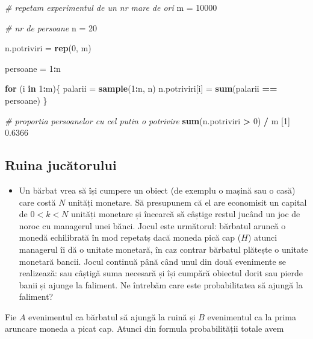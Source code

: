 \documentclass[]{article}
\newenvironment{Shaded}{\begin{snugshade}}{\end{snugshade}}
\newcommand{\KeywordTok}[1]{\textcolor[rgb]{0.13,0.29,0.53}{\textbf{#1}}}
\newcommand{\DecValTok}[1]{\textcolor[rgb]{0.00,0.00,0.81}{#1}}
\newcommand{\FloatTok}[1]{\textcolor[rgb]{0.00,0.00,0.81}{#1}}
\newcommand{\StringTok}[1]{\textcolor[rgb]{0.31,0.60,0.02}{#1}}
\newcommand{\CommentTok}[1]{\textcolor[rgb]{0.56,0.35,0.01}{\textit{#1}}}
\newcommand{\ControlFlowTok}[1]{\textcolor[rgb]{0.13,0.29,0.53}{\textbf{#1}}}
\newcommand{\OperatorTok}[1]{\textcolor[rgb]{0.81,0.36,0.00}{\textbf{#1}}}
\newcommand{\NormalTok}[1]{#1}
\newenvironment{frshaded*}{%
  \def\FrameCommand{\fboxrule=\FrameRule\fboxsep=\FrameSep \fcolorbox{framecolor}{shadecolor1}}%
  \MakeFramed {\advance\hsize-\width \FrameRestore}}%
{\endMakeFramed}
\newenvironment{rmdblock}[1]
  {\begin{frshaded*}
  \begin{itemize}
  \renewcommand{\labelitemi}{
    \raisebox{-.7\height}[0pt][0pt]{
      {\setkeys{Gin}{width=2em,keepaspectratio}\texttt{[image: images/icons/\#1]}}
    }
  }
  \item
  }
  {
  \end{itemize}
  \end{frshaded*}
  }
\newenvironment{rmdexercise}
  {\begin{rmdblock}{exercise}}
  {\end{rmdblock}}
\begin{document}
\begin{Shaded}
\begin{Highlighting}[]
\CommentTok{# repetam experimentul de un nr mare de ori}
\NormalTok{m =}\StringTok{ }\DecValTok{10000}

\CommentTok{# nr de persoane }
\NormalTok{n =}\StringTok{ }\DecValTok{20}

\NormalTok{n.potriviri =}\StringTok{ }\KeywordTok{rep}\NormalTok{(}\DecValTok{0}\NormalTok{, m)}

\NormalTok{persoane =}\StringTok{ }\DecValTok{1}\OperatorTok{:}\NormalTok{n}

\ControlFlowTok{for}\NormalTok{ (i }\ControlFlowTok{in} \DecValTok{1}\OperatorTok{:}\NormalTok{m)\{}
\NormalTok{  palarii =}\StringTok{ }\KeywordTok{sample}\NormalTok{(}\DecValTok{1}\OperatorTok{:}\NormalTok{n, n)}
\NormalTok{  n.potriviri[i] =}\StringTok{ }\KeywordTok{sum}\NormalTok{(palarii }\OperatorTok{==}\StringTok{ }\NormalTok{persoane)}
\NormalTok{\}}

\CommentTok{# proportia persoanelor cu cel putin o potrivire }
\KeywordTok{sum}\NormalTok{(n.potriviri }\OperatorTok{>}\StringTok{ }\DecValTok{0}\NormalTok{) }\OperatorTok{/}\StringTok{ }\NormalTok{m}
\NormalTok{[}\DecValTok{1}\NormalTok{] }\FloatTok{0.6366}
\end{Highlighting}
\end{Shaded}

\subsection{Ruina jucătorului}\label{ruina-jucatorului}

\begin{rmdexercise}
Un bărbat vrea să își cumpere un obiect (de exemplu o mașină sau o casă)
care costă \(N\) unități monetare. Să presupunem că el are economisit un
capital de \(0 < k < N\) unități monetare și încearcă să câștige restul
jucând un joc de noroc cu managerul unei bănci. Jocul este următorul:
bărbatul aruncă o monedă echilibrată în mod repetatș dacă moneda pică
cap (\(H\)) atunci managerul îi dă o unitate monetară, în caz contrar
bărbatul plătește o unitate monetară bancii. Jocul continuă până când
unul din două evenimente se realizează: sau câștigă suma necesară și își
cumpără obiectul dorit sau pierde banii și ajunge la faliment. Ne
întrebăm care este probabilitatea să ajungă la faliment?
\end{rmdexercise}

Fie \(A\) evenimentul ca bărbatul să ajungă la ruină și \(B\)
evenimentul ca la prima aruncare moneda a picat cap. Atunci din formula
probabilității totale avem
\end{document}
